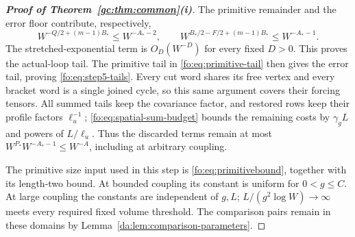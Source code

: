 \documentclass[11pt]{article}
\numberwithin{equation}{section}
\theoremstyle{remark}
\begin{document}
\begin{proof}[\textbf{Proof of Theorem~\ref{gc:thm:common}(i)}]
The primitive remainder and the error floor contribute, respectively,
\[
 W^{-Q/2+(m-1)B_*}\le W^{-A_*-2},\qquad
 W^{B_*/2-F/2+(m-1)B_*}\le W^{-A_*-1}.
\]
The stretched-exponential term is $O_D(W^{-D})$ for every fixed $D>0$.
This proves the actual-loop tail. The primitive tail in
\eqref{fo:eq:primitive-tail} then gives the error tail, proving
\eqref{fo:eq:step5-tails}. Every cut word shares its free vertex and
every bracket word is a single joined cycle, so this same argument
covers their forcing tensors. All summed tails keep the covariance
factor, and restored rows keep their profile factors $\ell_u^{-1}$;
\eqref{fo:eq:spatial-sum-budget} bounds the remaining costs by
$\gamma_gL$ and powers of $L/\ell_u$. Thus the discarded terms remain
at most $W^{P_*}W^{-A_*-1}\le W^{-A}$, including at arbitrary coupling.

The primitive size input used in this step is
\eqref{fo:eq:primitivebound}, together with its length-two bound.
At bounded coupling its constant is uniform for $0<g\le C$.
At large coupling the constants are independent of $g,L$;
$L/(g^2\log W)\to\infty$ meets every required fixed volume threshold.
The comparison pairs remain in these domains by
Lemma~\ref{da:lem:comparison-parameters}.


\end{proof}
\end{document}
